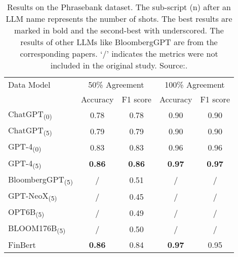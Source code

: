 \begin{table}[!h]
	\centering
	\begin{tabularx}{0.8\textwidth}{Xcccc}
		\toprule
		Data Model                      & \multicolumn{2}{c}{50\% Agreement} & \multicolumn{2}{c}{100\% Agreement}                                 \\
		                                & Accuracy                           & F1 score                            & Accuracy      & F1 score      \\
		\midrule
		ChatGPT\textsubscript{(0)}      & 0.78                               & 0.78                                & 0.90          & 0.90          \\
		ChatGPT\textsubscript{(5)}      & 0.79                               & 0.79                                & 0.90          & 0.90          \\
		GPT-4\textsubscript{(0)}        & 0.83                               & 0.83                                & 0.96          & 0.96          \\
		GPT-4\textsubscript{(5)}        & \textbf{0.86}                      & \textbf{0.86}                       & \textbf{0.97} & \textbf{0.97} \\
		BloombergGPT\textsubscript{(5)} & /                                  & 0.51                                & /             & /             \\
		GPT-NeoX\textsubscript{(5)}     & /                                  & 0.45                                & /             & /             \\
		OPT6B\textsubscript{(5)}        & /                                  & 0.49                                & /             & /             \\
		BLOOM176B\textsubscript{(5)}    & /                                  & 0.50                                & /             & /             \\
		FinBert                         & \textbf{0.86}                      & 0.84                                & \textbf{0.97} & 0.95          \\
		\bottomrule
	\end{tabularx}
	\caption{Results on the Phrasebank dataset. The sub-script (n) after an LLM name represents the number of shots. The best results are marked in bold and the second-best with underscored. The results of other LLMs like BloombergGPT are from the corresponding papers. ‘/’ indicates the metrics were not included in the original study. Source:\protect\textcite{li2023chatgpt}.}
	\label{tab:finllm_comparison}
\end{table}
